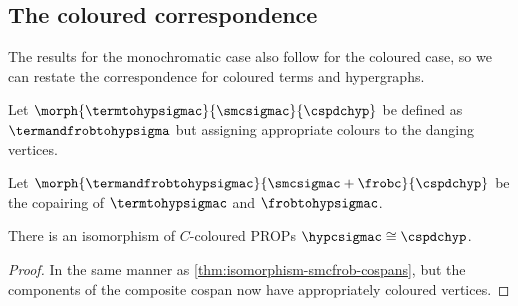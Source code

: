 \subsection{The coloured correspondence}

The results for the monochromatic case also follow for the coloured case, so we
can restate the correspondence for coloured terms and hypergraphs.

\begin{definition}
    Let \(\morph{\termtohypsigmac}{\smcsigmac}{\cspdchyp}\) be defined
    as \(\termandfrobtohypsigma\) but assigning appropriate colours to the
    danging vertices.
\end{definition}

\begin{definition}
    Let \(
    \morph{\termandfrobtohypsigmac}{\smcsigmac + \frobc}{\cspdchyp}
    \) be the copairing of \(\termtohypsigmac\) and
    \(\frobtohypsigmac\).
\end{definition}

\begin{theorem}
    There is an isomorphism of \(C\)-coloured PROPs
    \(\hypcsigmac \cong \cspdchyp\).
\end{theorem}
\begin{proof}
    In the same manner as \cref{thm:isomorphism-smcfrob-cospans}, but the
    components of the composite cospan now have appropriately coloured vertices.
\end{proof}